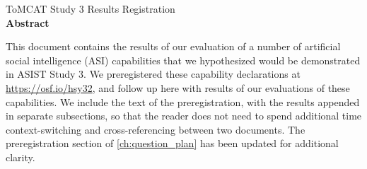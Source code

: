 

\thispagestyle{empty}
\begin{center}
    {\LARGE ToMCAT Study 3 Results Registration}\\
    \bigskip
    \textbf{Abstract}
\end{center}

    This document contains the results of our evaluation of a number of
    artificial social intelligence (ASI) capabilities that we hypothesized
    would be demonstrated in ASIST Study 3. We preregistered these capability
    declarations at \url{https://osf.io/hsy32}, and follow up here with results
    of our evaluations of these capabilities. We include the text of the
    preregistration, with the results appended in separate subsections, so that
    the reader does not need to spend additional time context-switching and
    cross-referencing between two documents. The preregistration section of
    \autoref{ch:question_plan} has been updated for additional clarity.

